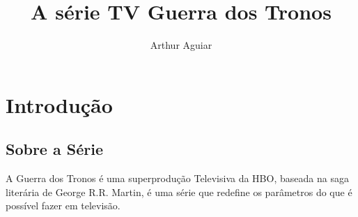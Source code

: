 \documentclass[11pt, a4paper]{report}
\author{Arthur Aguiar}
\title{A série TV Guerra dos Tronos}
\date{}
\begin{document}
\maketitle
\chapter{Introdução}
\section{Sobre a Série}

A {\huge Guerra dos Tronos} é uma superprodução Televisiva da HBO,
 baseada na saga literária de George R.R. Martin, é uma série
 que {\tiny redefine os parâmetros do que é possível fazer em televisão.}

 
\end{document}
